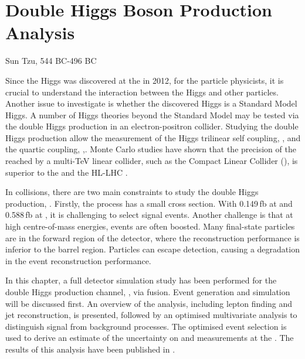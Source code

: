 \chapter{Double Higgs Boson Production Analysis}
\label{chap:DoubleHiggs}

%
{Sun Tzu, 544 BC-496 BC}%


Since the Higgs was discovered at the \LHC in 2012\cite{Aad:2012tfa,Chatrchyan:2012ufa}, for the particle physicists, it is crucial to understand the interaction between the Higgs and other particles. Another issue to investigate is whether the discovered Higgs is a Standard Model Higgs. A number of Higgs theories beyond the Standard Model may be tested via the double Higgs production in an electron-positron collider. Studying the double Higgs production allow the measurement of the Higgs trilinear self coupling, \gHHH, and the quartic coupling, \gWWHH,. Monte Carlo studies have shown that the precision of the \gHHH reached by a multi-TeV linear collider, such as the Compact Linear Collider (\CLIC), is superior to the \LHC and the HL-LHC  \cite{Contino:2013gna}.


In \ee collisions, there are two main constraints to study the double Higgs production,  \eeToHH. Firstly, the process has a small cross section. With 0.149\,fb at  and 0.588\,fb at , it is challenging to select signal events. Another challenge is that at high centre-of-mass energies, events are often boosted.  Many final-state particles are in the forward region of the detector, where the reconstruction performance is inferior to the barrel region.  Particles can escape detection, causing a degradation in the event reconstruction performance.


In this chapter, a full \CLICILD detector simulation study has been performed for the double Higgs production channel, \eeToHH, via \WW fusion. Event generation and simulation will be discussed first. An overview of the analysis, including lepton finding and jet reconstruction, is presented, followed by an optimised multivariate analysis to distinguish signal from background processes. The optimised event selection is used to derive an estimate of the uncertainty on  \gHHH and \gWWHH measurements at the \CLIC. The results of this analysis have been published in \cite{Abramowicz:2016zbo}.

